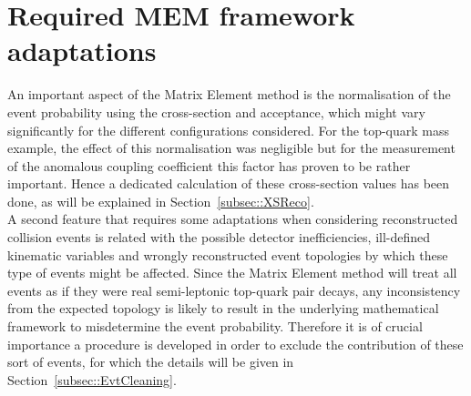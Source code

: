\section{Required MEM framework adaptations} \label{sec::RecoAdapt}

An important aspect of the Matrix Element method is the normalisation of the event probability using the cross-section and acceptance, which might vary significantly for the different configurations considered. For the top-quark mass example, the effect of this normalisation was negligible but for the measurement of the anomalous coupling coefficient this factor has proven to be rather important. 
Hence a dedicated calculation of these cross-section values has been done, as will be explained in Section~\ref{subsec::XSReco}.
\\

A second feature that requires some adaptations when considering reconstructed collision events is related with the possible detector inefficiencies, ill-defined kinematic variables and wrongly reconstructed event topologies by which these type of events might be affected.
Since the Matrix Element method will treat all events as if they were real semi-leptonic top-quark pair decays, any inconsistency from the expected topology is likely to result in the underlying mathematical framework to misdetermine the event probability.
Therefore it is of crucial importance a procedure is developed in order to exclude the contribution of these sort of events, for which the details will be given in Section~\ref{subsec::EvtCleaning}.

